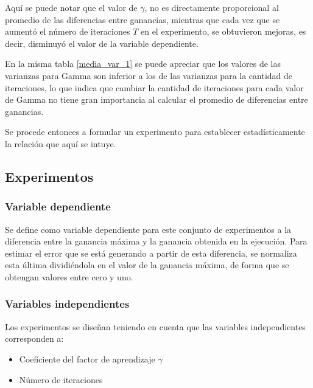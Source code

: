 Aquí se puede notar que el valor de $\gamma$, no es directamente proporcional al promedio de las  diferencias entre ganancias, mientras que cada vez que se aumentó el número de iteraciones $T$ en el experimento, se obtuvieron mejoras, es decir, disminuyó el valor de la variable dependiente.

En la misma tabla \ref{media_var_1} se puede apreciar que los valores de las varianzas para Gamma son inferior a los de las varianzas para la cantidad de iteraciones, lo que indica que cambiar la cantidad de iteraciones para cada valor de Gamma no tiene gran importancia al calcular el promedio de diferencias entre ganancias.


Se procede entonces a formular un experimento para establecer estadísticamente la relación que aquí se intuye.


\subsection{Experimentos}

\subsubsection{Variable dependiente}

Se define como variable dependiente para este conjunto de experimentos a la diferencia entre la ganancia máxima y la ganancia obtenida en la ejecución. Para estimar el error que se está generando a partir de esta diferencia, se normaliza esta última dividiéndola en el valor de la ganancia máxima, de forma que se obtengan valores entre cero y uno.

\subsubsection{Variables independientes}
Los experimentos se diseñan teniendo en cuenta que las variables independientes corresponden a: 
\begin{itemize}
    \item Coeficiente del factor de aprendizaje $\gamma$
    \item Número de iteraciones
\end{itemize}

